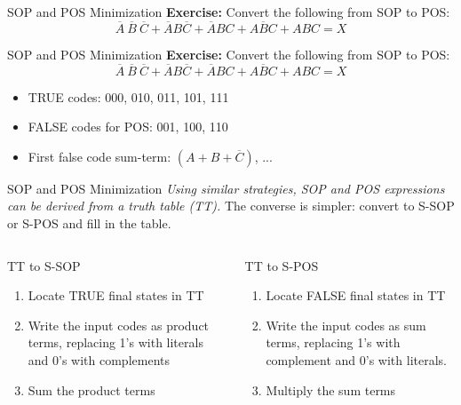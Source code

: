 \documentclass{beamer}
\begin{document}
\begin{frame}{SOP and POS Minimization}
\textbf{Exercise:} Convert the following from SOP to POS:
\begin{equation}
\overline{A}~\overline{B}~\overline{C}+\overline{A}B\overline{C}+\overline{A}BC+A\overline{B}C+ABC = X
\end{equation}
\end{frame}

\begin{frame}{SOP and POS Minimization}
\textbf{Exercise:} Convert the following from SOP to POS:
\begin{equation}
\overline{A}~\overline{B}~\overline{C}+\overline{A}B\overline{C}+\overline{A}BC+A\overline{B}C+ABC = X
\end{equation}
\begin{itemize}
\item TRUE codes: 000, 010, 011, 101, 111
\item FALSE codes for POS: 001, 100, 110
\item First false code sum-term: $(A+B+\overline{C})$, ...
\end{itemize}
\end{frame}

\begin{frame}{SOP and POS Minimization}
\textit{Using similar strategies, SOP and POS expressions can be derived from a truth table (TT).}  The converse is simpler: convert to S-SOP or S-POS and fill in the table.
\begin{columns}[T]
\small
\begin{column}{0.5\textwidth}
\centering
TT to S-SOP
\begin{enumerate}
\item Locate TRUE final states in TT
\item Write the input codes as product terms, replacing 1's with literals and 0's with complements
\item Sum the product terms
\end{enumerate}
\end{column}
\begin{column}{0.5\textwidth}
\centering
TT to S-POS
\begin{enumerate}
\item Locate FALSE final states in TT
\item Write the input codes as sum terms, replacing 1's with complement and 0's with literals.
\item Multiply the sum terms
\end{enumerate}
\end{column}
\end{columns}
\end{frame}
\end{document}
